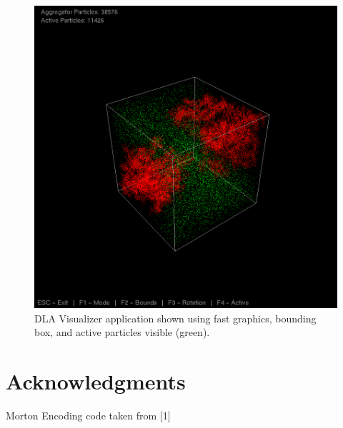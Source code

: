\documentclass[fleqn,10pt]{SelfArx} %
\begin{document}
\begin{figure}[ht]\centering %
    \includegraphics[width=\linewidth]{DLAVisualizer.png}
    \caption{DLA Visualizer application shown using fast graphics, bounding box, and active particles visible (green).}
    \label{fig:DLAAPP}
    \end{figure}



\section*{Acknowledgments} %
Morton Encoding code taken from [1]



\end{document}
